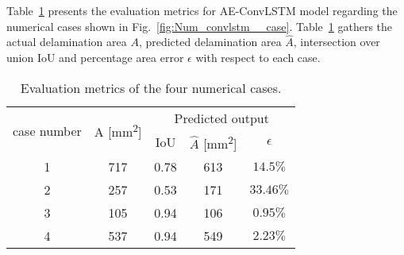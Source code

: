Table~\ref{tab:num_cases} presents the evaluation metrics for AE-ConvLSTM model regarding the numerical cases shown in Fig.~\ref{fig:Num_convlstm__case}.
Table~\ref{tab:num_cases} gathers the actual delamination area \(A\), predicted delamination area \(\hat{A}\), intersection over union IoU and percentage area error \(\epsilon\) with respect to each case. 
\begin{table}[!h]
	\centering
	\caption{Evaluation metrics of the four numerical cases.}
	\begin{tabular}{ccccc}
		\toprule
		\multirow{2}{*}{case number} & \multicolumn{1}{c}{\multirow{2}{*}{A [mm\textsuperscript{2}]}} & \multicolumn{3}{c}{Predicted output} \\ 
		\cmidrule(lr){3-5} & & \multicolumn{1}{c}{IoU} & \multicolumn{1}{c}{\(\hat{A}\) [mm\textsuperscript{2}]} & \(\epsilon\) \\
		\midrule
		1 & 717 & \multicolumn{1}{c}{0.78} & \multicolumn{1}{c}{613} & \(14.5\%\) \\ 
		2 & 257 & \multicolumn{1}{c}{0.53} & \multicolumn{1}{c}{171} & \(33.46\%\) \\ 
		3 & 105 & \multicolumn{1}{c}{0.94} & \multicolumn{1}{c}{106} & \(0.95\%\) \\ 
		4 & 537 & \multicolumn{1}{c}{0.94} & \multicolumn{1}{c}{549} & \(2.23\%\) \\ 
		\bottomrule
	\end{tabular}	
	\label{tab:num_cases}
\end{table}

